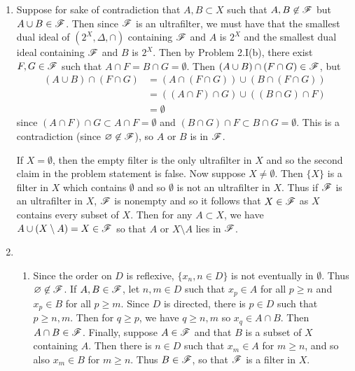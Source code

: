\begin{prob}[Filters]
\begin{enumerate}
\item Suppose for sake of contradiction that $A, B \subset X$ such that $A, B \not \in \mathscr{F}$ but $A\cup B \in \mathscr{F}$. Then since $\mathscr{F}$ is an ultrafilter, we must have that the smallest dual ideal of $(2^X, \Delta, \cap)$ containing $\mathscr{F}$ and $A$ is $2^X$ and the smallest dual ideal containing $\mathscr{F}$ and $B$ is $2^X$. Then by Problem 2.I(b), there exist $F, G \in \mathscr{F}$ such that $A\cap F = B\cap G = \emptyset$. Then $(A\cup B)\cap(F\cap G) \in \mathscr{F}$, but
\begin{align*}
(A\cup B)\cap(F\cap G) & = (A\cap(F\cap G))\cup(B\cap (F\cap G))\\
& = ((A\cap F)\cap G)\cup((B\cap G)\cap F)\\
& = \emptyset
\end{align*}
since $(A\cap F)\cap G \subset A\cap F = \emptyset$ and $(B\cap G)\cap F \subset B\cap G = \emptyset$. This is a contradiction (since $\varnothing\not\in\mathscr{F}$), so $A$ or $B$ is in $\mathscr{F}$.

If $X = \emptyset$, then the empty filter is the only ultrafilter in $X$ and so the second claim in the problem statement is false. Now suppose $X \not = \emptyset$. Then $\{X\}$ is a filter in $X$ which contains $\emptyset$ and so $\emptyset$ is not an ultrafilter in $X$. Thus if $\mathscr{F}$ is an ultrafilter in $X$, $\mathscr{F}$ is nonempty and so it follows that $X \in \mathscr{F}$ as $X$ contains every subset of $X$. Then for any $A \subset X$, we have $A\cup(X\setminus A) = X \in \mathscr{F}$ so that $A$ or $X\setminus A$ lies in $\mathscr{F}$.

\item
\begin{enumerate}
\item Since the order on $D$ is reflexive, $\{x_n, n \in D\}$ is not eventually in $\emptyset$. Thus $\varnothing \not \in \mathscr{F}$. If $A, B \in \mathscr{F}$, let $n, m \in D$ such that $x_p \in A$ for all $p \geq n$ and $x_p \in B$ for all $p \geq m$. Since $D$ is directed, there is $p \in D$ such that $p \geq n, m$. Then for $q \geq p$, we have $q \geq n, m$ so $x_q \in A\cap B$. Then $A\cap B \in \mathscr{F}$. Finally, suppose $A \in \mathscr{F}$ and that $B$ is a subset of $X$ containing $A$. Then there is $n \in D$ such that $x_m \in A$ for $m \geq n$, and so also $x_m \in B$ for $m \geq n$. Thus $B \in \mathscr{F}$, so that $\mathscr{F}$ is a filter in $X$.


\end{enumerate}
\end{enumerate}
\end{prob}

